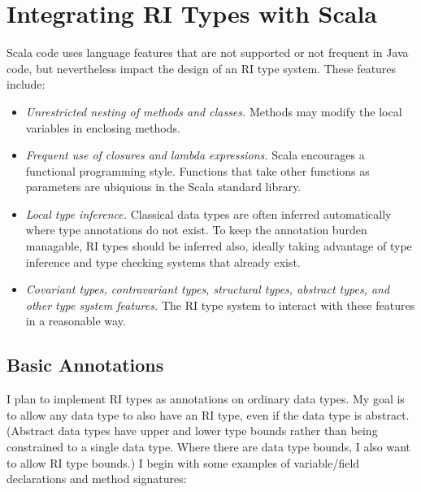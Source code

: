\documentclass[letterpaper,11pt]{article}
\theoremstyle{definition}
\theoremstyle{remark}
\begin{document}
\section{Integrating RI Types with Scala}
\label{scala-integration}

Scala code uses language features that are not supported or not frequent in Java code,
but nevertheless impact the design of an RI type system. These features include:
\begin{itemize}
	\item \emph{Unrestricted nesting of methods and classes.}
		Methods may modify the local variables in enclosing methods.
		
	\item \emph{Frequent use of closures and lambda expressions.}
		Scala encourages a functional programming style.
		Functions that take other functions as parameters are ubiquious in the Scala standard library.
		
	\item \emph{Local type inference.} Classical data types are often inferred automatically
		where type annotations do not exist. To keep the annotation burden managable,
		RI types should be inferred also, ideally taking advantage of type inference and type checking
		systems that already exist.
	
	\item \emph{Covariant types, contravariant types, structural types, abstract types, and
		other type system features.}
		The RI type system to interact with these features in a reasonable way.


\end{itemize}

\subsection{Basic Annotations}
\label{basic-annotations}

I plan to implement RI types as annotations on ordinary data types.
My goal is to allow any data type to also have an RI type,
even if the data type is abstract.
(Abstract data types have upper and lower type bounds rather than being
constrained to a single data type. Where there are data type bounds, I also want to allow
RI type bounds.)
I begin with some examples of variable/field declarations and method signatures:
\end{document}
